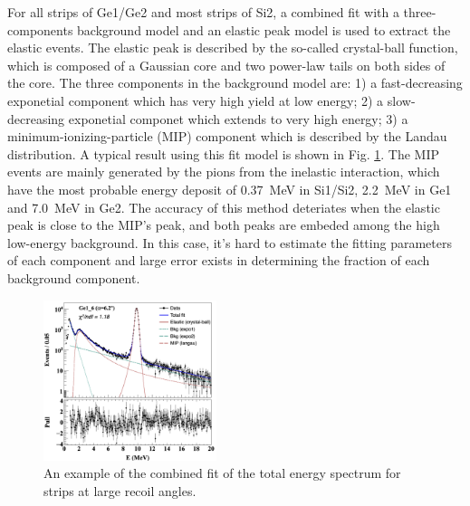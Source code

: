 \documentclass[fleqn,twocolumn,a4paper]{ikpar}
\begin{document}
For all strips of Ge1/Ge2 and most strips of Si2, a combined fit with
a three-components background model and an elastic peak model is used to extract
the elastic events.
The elastic peak is described by the so-called crystal-ball function\cite{r1}, which
is composed of a Gaussian core and two power-law tails on both sides of the core.
The three components in the background model are: 1) a
fast-decreasing exponetial component which has very high yield at low energy; 2)
a slow-decreasing exponetial componet which extends to very high energy; 3) a
minimum-ionizing-particle (MIP) component which is described by the Landau
distribution.
A typical result using this fit model is shown in Fig. \ref{fig:combined_fit}.
The MIP events are mainly generated by the pions from the inelastic interaction,
which have the most probable energy deposit of \SI{0.37}{\MeV} in Si1/Si2,
\SI{2.2}{\MeV} in Ge1 and \SI{7.0}{\MeV} in Ge2.
The accuracy of this method deteriates when the elastic peak is close to the MIP's
peak, and both peaks are embeded among the high low-energy background.
In this case, it's hard to estimate the fitting parameters of each component and large
error exists in determining the fraction of each background component.
\begin{figure}[!htb]
	\includegraphics[width=0.45\textwidth]{./combined_fit.png}
  \caption{An example of the combined fit of the total energy spectrum for strips at large recoil angles.}
  \label{fig:combined_fit}
\end{figure}

\par
\medskip
\end{document}

